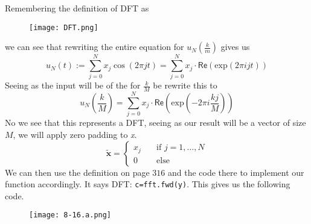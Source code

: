 \documentclass{article}
\begin{document}
\pagebreak

Remembering the definition of DFT as
\begin{figure}[!hbt]
    \centering
    \texttt{[image: DFT.png]}
\end{figure}
we can see that rewriting the entire equation for $u_N\left(\frac{k}{m}\right)$ gives us
\begin{equation*}
    u_{N}\left(t\right) := \sum_{j=0}^{N}x_{j}\cos\left(2\pi j t\right) = \sum_{j=0}^{N}x_{j}\cdot\mathsf{Re}\left(\text{exp}\left(2\pi i j t\right)\right)
\end{equation*}
Seeing as the input will be of the for $\frac{k}{M}$ be rewrite this to
\begin{equation*}
    u_{N}\left(\frac{k}{M}\right) = \sum_{j=0}^{N}x_{j}\cdot\mathsf{Re}\left(\text{exp}\left(-2\pi i \frac{kj}{M}\right)\right)
\end{equation*}
No we see that this represents a DFT, seeing as our result will be a vector of size $M$, we will apply zero padding to \textit{x}.
\begin{equation*}
    \tilde{\mathbf{x}} = \begin{cases}
        x_{j}\quad &\text{if } j = 1, \dots, N \\
        0 &\text{else}
    \end{cases}
\end{equation*}
We can then use the definition on page $316$ and the code there to implement our function accordingly. It says DFT: \verb|c=fft.fwd(y)|. This gives us the following code.
\begin{figure}[!hbt]
    \centering
    \texttt{[image: 8-16.a.png]}
\end{figure}
\end{document}
